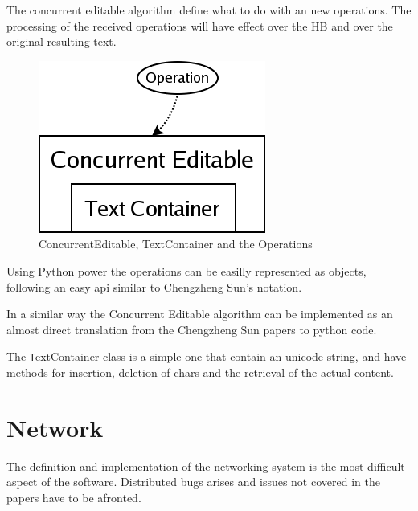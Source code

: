 \documentclass{report}
\begin{document}
The concurrent editable algorithm define what to do with an new operations. The processing of the received operations will have effect over the HB and over the original resulting text.


\begin{figure}[htbp]
 \begin{center}
    \includegraphics[angle=0,width=0.5\linewidth]{schemas/concurrent_editable.png}
 \end{center}
 \caption{ConcurrentEditable, TextContainer and the Operations}
 \label{fig:concurrenteditable}
\end{figure}


Using Python power the operations can be easilly represented as objects, following an easy api similar to Chengzheng Sun's notation.

In a similar way the Concurrent Editable algorithm can be implemented as an almost direct translation from the Chengzheng Sun papers to python code.

The {\texttt TextContainer } class is a simple one that contain an unicode string, and have methods for insertion, deletion of chars and the retrieval of the actual content.
\section{Network}

The definition and implementation of the networking system is the most difficult aspect of the software. Distributed bugs arises and issues not covered in the papers have to be afronted.
\end{document}
